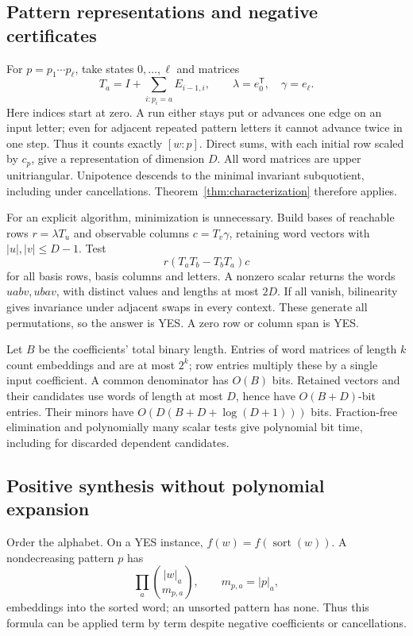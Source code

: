 \documentclass[acmlarge,screen,11pt,nonacm]{acmart}
\theoremstyle{definition}
\begin{document}
\subsection{Pattern representations and negative certificates}
For $p=p_1\cdots p_\ell$, take states $0,\ldots,\ell$ and matrices
\[
 T_a=I+\sum_{i:p_i=a}E_{i-1,i},
 \qquad\lambda=e_0^{\mathsf T},\quad\gamma=e_\ell.
\]
Here indices start at zero. A run either stays put or advances one edge on an input letter; even for adjacent repeated pattern letters it cannot advance twice in one step. Thus it counts exactly $[w:p]$. Direct sums, with each initial row scaled by $c_p$, give a representation of dimension $D$. All word matrices are upper unitriangular. Unipotence descends to the minimal invariant subquotient, including under cancellations. Theorem~\ref{thm:characterization} therefore applies.

For an explicit algorithm, minimization is unnecessary. Build bases of reachable rows $r=\lambda T_u$ and observable columns $c=T_v\gamma$, retaining word vectors with $|u|,|v|\leq D-1$. Test
\[
 r(T_aT_b-T_bT_a)c
\]
for all basis rows, basis columns and letters. A nonzero scalar returns the words $uabv,ubav$, with distinct values and lengths at most $2D$. If all vanish, bilinearity gives invariance under adjacent swaps in every context. These generate all permutations, so the answer is YES. A zero row or column span is YES.

Let $B$ be the coefficients' total binary length. Entries of word matrices of length $k$ count embeddings and are at most $2^k$; row entries multiply these by a single input coefficient. A common denominator has $O(B)$ bits. Retained vectors and their candidates use words of length at most $D$, hence have $O(B+D)$-bit entries. Their minors have $O(D(B+D+\log(D+1)))$ bits. Fraction-free elimination and polynomially many scalar tests give polynomial bit time, including for discarded dependent candidates.

\subsection{Positive synthesis without polynomial expansion}
Order the alphabet. On a YES instance, $f(w)=f(\operatorname{sort}(w))$. A nondecreasing pattern $p$ has
\[
 \prod_a\binom{|w|_a}{m_{p,a}},\qquad m_{p,a}=|p|_a,
\]
embeddings into the sorted word; an unsorted pattern has none. Thus this formula can be applied term by term despite negative coefficients or cancellations.
\end{document}

